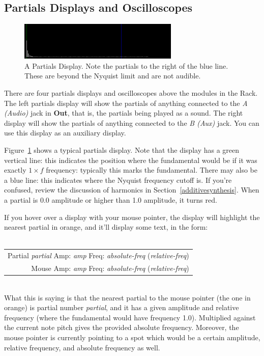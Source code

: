 \documentclass{article}
\begin{document}
\subsection{Partials Displays and Oscilloscopes}

\begin{figure}
\vspace{-1em}
\includegraphics[width=3in]{display}
\caption{A Partials Display.  Note the partials to the right of the blue line.  These are beyond the Nyquist limit and are not audible.}
\label{display}
\end{figure}

There are four partials displays and oscilloscopes above the modules in the Rack.  The left partials display will show the partials of anything connected to the {\it A (Audio)} jack in {\bf Out}, that is, the partials being played as a sound.  The right display will show the partials of anything connected to the {\it B (Aux)} jack.  You can use this display as an auxiliary display.

Figure~\ref{display} shows a typical partials display.  Note that the display has a green vertical line: this indicates the position where the fundamental would be if it was exactly \(1\times f\) frequency: typically this marks the fundamental.  There may also be a blue line: this indicates where the Nyquist frequency cutoff is. If you're confused, review the discussion of harmonics in Section~\ref{additivesynthesis}.  When a partial is 0.0 amplitude or higher than 1.0 amplitude, it turns red.

If you hover over a display with your mouse pointer, the display will highlight the nearest partial in orange, and it'll display some text, in the form:\\
\\
\begin{tabular}{@{\hspace{1in}}r}
Partial {\it partial}  Amp: {\it amp}  Freq: {\it absolute-freq} ({\it relative-freq})\\
Mouse  Amp: {\it amp}  Freq: {\it absolute-freq} ({\it relative-freq})\\
\end{tabular}\\

What this is saying is that the nearest partial to the mouse pointer (the one in orange) is partial number {\it partial}, and it has a given amplitude and relative frequency (where the fundamental would have frequency 1.0).  Multiplied against the current note pitch gives the provided absolute frequency.  Moreover, the mouse pointer is currently pointing to a spot which would be a certain amplitude, relative frequency, and absolute frequency as well.
\end{document}
